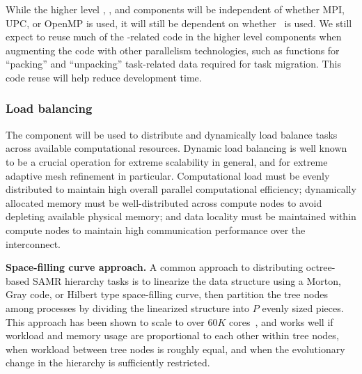 \documentclass[10pt,twocolumn]{article}
\begin{document}
While the higher level , , and
 components will be independent of whether MPI, UPC,
or OpenMP is used, it will still be dependent on whether \charm\ is
used.  We still expect to reuse much of the \charm-related code in the
higher level components when augmenting the code with other
parallelism technologies, such as functions for ``packing'' and
``unpacking'' task-related data required for task migration.  This
code reuse will help reduce development time.

\subsubsection{Load balancing} \label{sss:design-balance}

The  component will be used to distribute and
dynamically load balance tasks across available computational
resources.  Dynamic load balancing is well known to be a crucial
operation for extreme scalability in general, and for extreme adaptive
mesh refinement in particular.  Computational load must be evenly
distributed to maintain high overall parallel computational
efficiency; dynamically allocated memory must be well-distributed
across compute nodes to avoid depleting available physical memory; and
data locality must be maintained within compute nodes to maintain high
communication performance over the interconnect.

\textbf{Space-filling curve approach.}
A common approach to distributing octree-based SAMR hierarchy tasks is
to linearize the data structure using a Morton, Gray code, or Hilbert
type space-filling curve, then partition the tree nodes among
processes by dividing the linearized structure into $P$ evenly sized
pieces.  This approach has been shown to scale to over $60K$
cores~\cite{@@@ART}, and works well if workload and memory usage are
proportional to each other within tree nodes, when workload between
tree nodes is roughly equal, and when the evolutionary change in the
hierarchy is sufficiently restricted.
\end{document}
